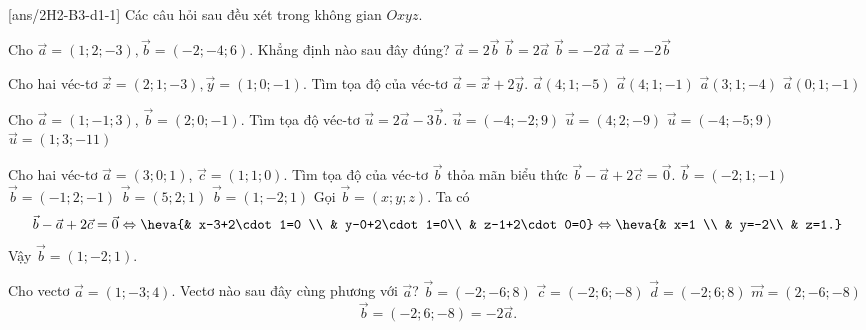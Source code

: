  \\
\setcounter{ex}{0}
[ans/2H2-B3-d1-1]
Các câu hỏi sau đều xét trong không gian $Oxyz$.
\begin{ex}
	Cho $\vec{a}=(1;2;-3),\vec{b}=(-2;-4;6)$. Khẳng định nào sau đây đúng?
	\choice
	{$\vec{a}=2\vec{b}$}
	{$\vec{b}=2\vec{a}$}
	{\True $\vec{b}=-2\vec{a}$}
	{$\vec{a}=-2\vec{b}$}
\end{ex} 

\begin{ex}
	Cho hai véc-tơ $\vec{x}=(2;1;-3),\vec{y}=(1;0;-1)$. Tìm tọa độ của véc-tơ $\vec{a}=\vec{x}+2\vec{y}$.
	\choice
	{\True $\vec{a}(4;1;-5)$}
	{$\vec{a}(4;1;-1)$}
	{$\vec{a}(3;1;-4)$}
	{$\vec{a}(0;1;-1)$}
\end{ex} 

\begin{ex}
	Cho $\vec{a}=(1;-1;3)$, $\vec{b}=(2;0;-1)$. Tìm tọa độ véc-tơ $\vec{u}=2\vec{a}-3\vec{b}$.
	\choice
	{\True $\vec{u}=(-4;-2;9)$}
	{$\vec{u}=(4;2;-9)$}
	{$\vec{u}=(-4;-5;9)$}
	{$\vec{u}=(1;3;-11)$}
\end{ex} 

\begin{ex}
	Cho hai véc-tơ  $\vec{a}=(3;0;1)$,  $\vec{c}=(1;1;0)$. Tìm tọa độ của véc-tơ $\vec{b}$ thỏa mãn biểu thức  $\vec{b}-\vec{a}+2\vec{c}=\vec{0}$.
	\choice
	{$\vec{b}=(-2;1;-1)$}
	{$\vec{b}=(-1;2;-1)$}
	{$\vec{b}=(5;2;1)$}
	{\True $\vec{b}=(1;-2;1)$}
	\loigiai
	{Gọi $\vec{b}=\left(x; y; z\right)$. Ta có
		$$\vec{b}-\vec{a}+2\vec{c}=\vec{0}\Leftrightarrow\heva{& x-3+2\cdot 1=0 \\ & y-0+2\cdot 1=0\\ & z-1+2\cdot 0=0}\Leftrightarrow\heva{& x=1 \\ & y=-2\\ & z=1.}$$
		Vậy $\vec{b}=(1;-2;1)$.
	}
\end{ex} 

\begin{ex}
	Cho vectơ $\vec{a}=(1;-3;4)$. Vectơ  nào sau đây cùng phương với $\vec{a}$?
	\choice
	{$\vec{b}=(-2;-6;8)$}
	{\True $\vec{c}=(-2;6;-8)$}
	{$\vec{d}=(-2;6;8)$}
	{$\vec{m}=(2;-6;-8)$}
	\loigiai
	{
		$$\vec{b}=(-2;6;-8)=-2\vec{a}.$$
	}
\end{ex} 

